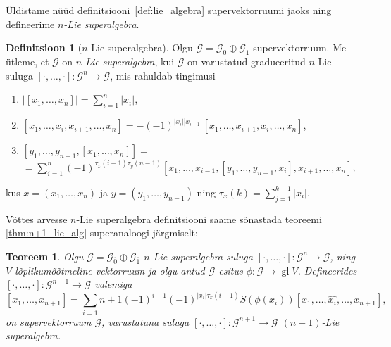 \documentclass[12pt,a4paper]{article}
\theoremstyle{plain}
\newtheorem{thm}{Teoreem}[section]
\theoremstyle{definition}
\newtheorem{dfn}{Definitsioon}[section]
\newcommand{\G}{\mathcal{G}}
\DeclareMathOperator{\gl}{gl}
\newcommand{\col}{\colon}
\newcommand{\arr}{\rightarrow}
\newcommand{\nbrac}[2]{\ensuremath{\left[ #1, \dots, #2 \right]}}
\begin{document}
Üldistame nüüd definitsiooni~\ref{def:lie_algebra} supervektorruumi jaoks
ning defineerime \emph{$n$-Lie superalgebra}.

\begin{dfn}[$n$-Lie superalgebra]
    Olgu $\G = \G_{\overline{0}} \oplus \G_{\overline{1}}$ 
    supervektorruum. Me ütleme, et $\G$ on
    \emph{$n$-Lie superalgebra}, kui $\G$ on varustatud
    gradueeritud $n$-Lie suluga $\nbrac{\cdot}{\cdot} \col \G^n \arr \G$,
    mis rahuldab tingimusi
    \begin{enumerate}
        \item $\left| \nbrac{x_1}{x_n} \right| = \sum_{i=1}^n |x_i| $,
        \item $\left[ x_1, \dots, x_i, x_{i+1}, \dots, x_n \right] =
            -(-1)^{|x_i| |x_{i+1}|} \left[
                x_1, \dots, x_{i+1}, x_i, \dots, x_n
            \right]$,
        \item $\left[ y_1, \dots, y_{n-1}, \nbrac{x_1}{x_n} \right] = $ \\
            $ = \sum_{i=1}^n (-1)^{\tau_x (i-1) \tau_y (n-1)}
            \left[
                x_1, \dots, x_{i-1},
                \left[ y_1, \dots, y_{n-1}, x_i \right],
                x_{i+1}, \dots, x_n
            \right] $,
    \end{enumerate}
    kus $x = (x_1, \dots, x_n)$ ja $y = (y_1, \dots, y_{n-1})$ ning
    $\tau_x (k) = \sum_{j=1}^{k-1} |x_i|$.
\end{dfn}

Võttes arvesse $n$-Lie superalgebra definitsiooni saame sõnastada 
teoreemi \ref{thm:n+1_lie_alg} superanaloogi järgmiselt:

\begin{thm}
    Olgu $\G = \G_{\overline{0}} \oplus \G_{\overline{1}}$
    $n$-Lie superalgebra suluga $\nbrac{\cdot}{\cdot} \col \G^n \arr \G$,
    ning $V$ lõplikumõõtmeline vektorruum ja olgu
    antud $\G$ esitus $\phi \col \G \arr \gl V$. Defineerides
    $\nbrac{\cdot}{\cdot} \col \G^{n+1} \arr \G$ valemiga
    \[
        \nbrac{x_1}{x_{n+1}} = \sum_{i=1}{n+1}
        (-1)^{i-1} (-1)^{|x_i| \tau_x (i-1)} S(\phi(x_i))
        \left[ x_1, \dots, \hat{x_i}, \dots, x_{n+1} \right],
    \]
    on supervektorruum $\G$, varustatuna suluga
    $\nbrac{\cdot}{\cdot} \col \G^{n+1} \arr \G$ $(n+1)$-Lie
    superalgebra.
\end{thm}
\end{document}
